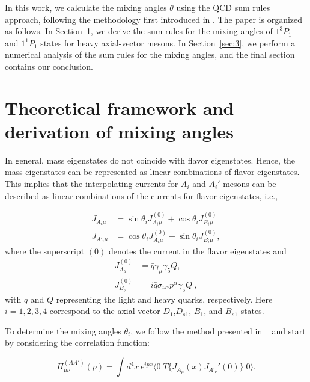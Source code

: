 \documentclass[prd,a4paper,preprint,preprintnumbers,nofootinbib,superscriptaddress]{revtex4-2}
\begin{document}
In this work, we calculate the mixing angles $\theta$ using the QCD sum rules approach, following the methodology first introduced in \cite{Aliev:2010ra}.
The paper is organized as follows. In Section~\ref{sec:2}, we derive the sum rules for the mixing angles of $1^{3}P_1$ and $1^{1}P_1$ states for heavy axial-vector mesons. In Section~\ref{sec:3}, we perform a numerical analysis of the sum rules for the mixing angles, and the final section contains our conclusion.
% 
\section{Theoretical framework and derivation of mixing angles}
\label{sec:2}
%
In general, mass eigenstates do not coincide with flavor eigenstates. Hence, the mass eigenstates can be represented as linear combinations of flavor eigenstates. This implies that the interpolating currents for $A_i$ and \(A_i'\) mesons can be described as linear combinations of the currents for flavor eigenstates, i.e.,

\begin{equation}
  \label{eq:2}
  \begin{split}
    J_{A_i \mu} &= \sin{\theta_i} J_{A_i \mu}^{(0)} + \cos{\theta_i} J_{B_i \mu}^{(0)} \\
   J_{A'_i \mu} &= \cos{\theta_i} J_{A_i \mu}^{(0)} - \sin{\theta_i} J_{B_i \mu}^{(0)},
  \end{split}
\end{equation}
%
where the superscript \((0)\) denotes the current in the flavor eigenstates and
%
\begin{equation}
  \label{eq:4}
  \begin{split}
    J_{A_\mu}^{(0)} &= \bar{q} \gamma_\mu \gamma_5 Q, \quad \\
    J_{B_\nu}^{(0)} &= i \bar{q} \sigma_{\nu \alpha} p^\alpha \gamma_5 Q~,
  \end{split}
\end{equation}
with  \(q\) and \(Q\) representing the light and heavy quarks, respectively. Here  \(i = 1, 2, 3, 4\) correspond to the axial-vector \(D_{1}\),\(D_{s1}\), \(B_{1}\), and \(B_{s1}\) states. 

To determine the mixing angles \(\theta_i\), we follow the method presented in ~\cite{Aliev:2010ra} and start by considering the correlation function:

\begin{equation}
  \label{eq:3}
  \Pi_{\mu \nu}^{(A A')} (p) = \int d^4x \, e^{ipx} \langle 0 | T \{ J_{A_\mu}(x) \bar{J}_{A'_\nu}'(0) \} | 0 \rangle.
\end{equation}
\end{document}
